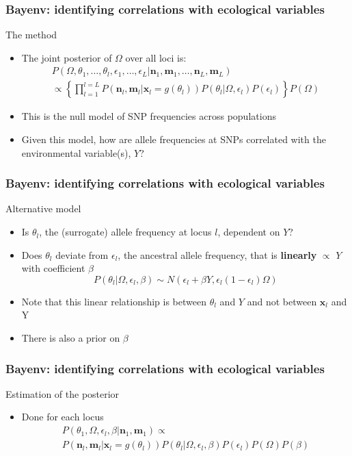 \begin{frame}
\frametitle{Bayenv: identifying correlations with ecological
variables}
\begin{block}{The method}
\begin{itemize}
\item{The joint posterior of $\Omega$ over all loci is:}
\begin{multline}
P(\Omega, \theta_1, \ldots , \theta_l, 
\epsilon_1, \ldots , \epsilon_L | 
\bm{n}_1, \bm{m}_1, \ldots , \bm{n}_L, \bm{m}_L) \\
\propto \left \{ \prod_{l=1}^{l=L}P(\bm{n}_l,\bm{m}_l | \bm{x}_l = g(\theta_l))
P(\theta_l | \Omega,\epsilon_l)P(\epsilon_l)
\right \}P(\Omega)	
\end{multline}
\item{This is the null model of SNP frequencies across populations}
\item{Given this model, how are allele frequencies at SNPs correlated with 
the environmental variable(s), $Y$?}
\end{itemize}
\end{block}
\end{frame}

\begin{frame}
\frametitle{Bayenv: identifying correlations with ecological
variables}
\begin{block}{Alternative model}
\begin{itemize}
\item{Is $\theta_l$, the (surrogate) allele frequency at locus $l$, dependent
on $Y$?}
\item{Does $\theta_l$ deviate from $\epsilon_l$, the ancestral allele
frequency, that is \textbf{linearly} $\propto$ $Y$ with coefficient $\beta$}
\begin{equation}
P(\theta_l | \Omega, \epsilon_l, \beta) \sim 
N(\epsilon_l + \beta Y, \epsilon_l(1-\epsilon_l)\Omega)	
\end{equation}
\item{Note that this linear relationship is between $\theta_l$ and $Y$ and not
between $\bm{x}_l$ and Y}
\item{There is also a prior on $\beta$}
\end{itemize}
\end{block}
\end{frame}

\begin{frame}
\frametitle{Bayenv: identifying correlations with ecological
variables}
\begin{block}{Estimation of the posterior}
\begin{itemize}
\item{Done for each locus}
\begin{multline}
P(\theta_1, \Omega, \epsilon_l, \beta | 
\bm{n}_1, \bm{m}_1) \propto \\
P(\bm{n}_l,\bm{m}_l | \bm{x}_l = g(\theta_l))
P(\theta_l | \Omega,\epsilon_l,\beta)P(\epsilon_l)P(\Omega)P(\beta)	
\end{multline}
\end{itemize}
\end{block}
\end{frame}

